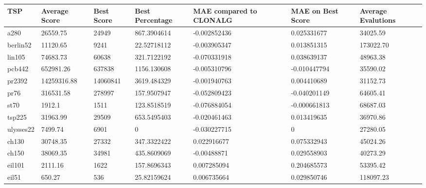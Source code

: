 \begin{table}[H]
	\begin{tabular}{|l|p{2cm}|p{1.6cm}|p{2.2cm}|p{2.4cm}|p{2.4cm}|p{1.7cm}|}
		\hline
		TSP       & Average Score & Best Score & Best Percentage & MAE compared to CLONALG & MAE on Best Score & Average Evalutions \\ \hline
		a280      & 26559.75      & 24949      & 867.3904614     & -0.002852436            & 0.025331677       & 34025.59           \\ \hline
		berlin52  & 11120.65      & 9241       & 22.52718112     & -0.003905347            & 0.013851315       & 173022.70          \\ \hline
		lin105    & 74683.73      & 60638      & 321.7122192     & -0.070331918            & 0.038639137       & 48963.38           \\ \hline
		pcb442    & 652981.26     & 637838     & 1156.130608     & -0.005310796            & -0.010447794      & 35590.02           \\ \hline
		pr2392    & 14259316.88   & 14060841   & 3619.484329     & -0.001940763            & 0.004410689       & 31152.73           \\ \hline
		pr76      & 316531.58     & 278997     & 157.9507947     & -0.052809423            & -0.040201149      & 64605.41           \\ \hline
		st70      & 1912.1        & 1511       & 123.8518519     & -0.076884054            & -0.000661813      & 68687.03           \\ \hline
		tsp225    & 31963.99      & 29509      & 653.5495403     & -0.020461463            & 0.013419635       & 36970.86           \\ \hline
		ulysses22 & 7499.74       & 6901       & 0               & -0.030227715            & 0                 & 27280.05           \\ \hline
		ch130     & 30748.35      & 27332      & 347.3322422     & 0.022916677             & 0.075332943       & 45024.26           \\ \hline
		ch150     & 38069.35      & 34981      & 435.8609069     & -0.00488871             & 0.029558903       & 40273.29           \\ \hline
		eil101    & 2111.16       & 1622       & 157.8696343     & 0.007285094             & 0.204685573       & 53395.42           \\ \hline
		eil51     & 650.27        & 536        & 25.82159624     & 0.006735664             & 0.029850746       & 118097.23          \\ \hline

\end{tabular}
\end{table}
